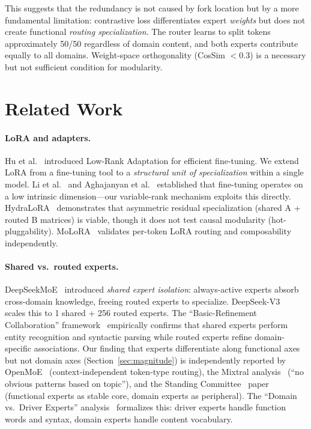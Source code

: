 \documentclass{article}
\begin{document}
This suggests that the redundancy is not caused by fork location but by a more
fundamental limitation: contrastive loss differentiates expert \emph{weights}
but does not create functional \emph{routing specialization}. The router
learns to split tokens approximately 50/50 regardless of domain content,
and both experts contribute equally to all domains. Weight-space orthogonality
(CosSim $<$0.3) is a necessary but not sufficient condition for modularity.

\section{Related Work}
\label{sec:related}

\paragraph{LoRA and adapters.}
Hu et al.~\cite{hu2022lora} introduced Low-Rank Adaptation for efficient
fine-tuning. We extend LoRA from a fine-tuning tool to a \emph{structural unit
of specialization} within a single model. Li et al.~\cite{li2018intrinsic}
and Aghajanyan et al.~\cite{aghajanyan2021intrinsic} established that
fine-tuning operates on a low intrinsic dimension---our variable-rank mechanism
exploits this directly. HydraLoRA~\cite{hydralora2024} demonstrates that asymmetric residual
specialization (shared A + routed B matrices) is viable, though it does not
test causal modularity (hot-pluggability). MoLoRA~\cite{molora2026} validates
per-token LoRA routing and composability independently.

\paragraph{Shared vs.\ routed experts.}
DeepSeekMoE~\cite{deepseek2024moe} introduced \emph{shared expert isolation}:
always-active experts absorb cross-domain knowledge, freeing routed experts to
specialize. DeepSeek-V3~\cite{deepseekv3} scales this to 1 shared + 256
routed experts. The ``Basic-Refinement Collaboration''
framework~\cite{basicrefinement2025} empirically confirms that shared experts
perform entity recognition and syntactic parsing while routed experts refine
domain-specific associations. Our finding that experts differentiate along
functional axes but not domain axes (Section~\ref{sec:magnitude}) is
independently reported by OpenMoE~\cite{openmoe2024} (context-independent
token-type routing), the Mixtral analysis~\cite{mixtral2024} (``no obvious
patterns based on topic''), and the Standing
Committee~\cite{standing2026} paper (functional experts as stable core, domain
experts as peripheral). The ``Domain vs.\ Driver Experts''
analysis~\cite{domaindriver2026} formalizes this: driver experts handle
function words and syntax, domain experts handle content vocabulary.
\end{document}
